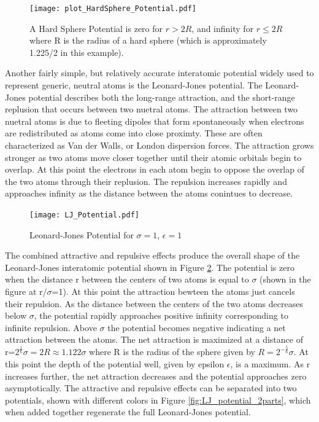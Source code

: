 \documentclass[double,12pt]{beavtex}
\begin{document}
\begin{figure}[h!]
    \centering
    \texttt{[image: plot\_HardSphere\_Potential.pdf]}
    \caption{A Hard Sphere Potential is zero for $r>2R$, and infinity 
    for $r\leq{2R}$ where R is the radius of a hard sphere (which is 
    approximately 1.225/2 in this example).}
    \label{fig:HardSphere_potential}
  \end{figure}

Another fairly simple, but relatively accurate interatomic potential widely 
used to represent generic, neutral atoms is the Leonard-Jones potential. 
The Leonard-Jones potential describes both the long-range attraction, 
and the short-range replusion that occurs between two nuetral atoms. 
The attraction between two nuetral atoms is due to fleeting dipoles that 
form spontaneously when electrons are redistributed as atoms come into 
close proximty. These are often characterized as Van der Walls, or London 
dispersion forces. The attraction grows stronger as two atoms move closer 
together until their atomic orbitals begin to overlap. 
At this point the electrons in each atom begin to oppose the overlap of 
the two atoms through their replusion. The repulsion increases rapidly and 
approaches infinity as the distance between the atoms conintues to decrease.  
 
\begin{figure}[h!]
    \centering
    \texttt{[image: LJ\_Potential.pdf]}
    \caption{Leonard-Jones Potential for $\sigma=1$, $\epsilon=1$}
    \label{fig:LJ_potential}
  \end{figure}

The combined attractive and repulsive effects produce the overall shape of 
the Leonard-Jones interatomic potential shown in Figure \ref{fig:LJ_potential}. 
The potential is zero when the distance r between the centers of two atoms 
is equal to $\sigma$ (shown in the figure at r/$\sigma$=1). At this point 
the attraction bewteen the atoms just cancels their repulsion. As the distance 
between the centers of the two atoms decreases below $\sigma$, the potential 
rapidly approaches positive infinity corresponding to infinite repulsion. 
Above $\sigma$ the potential becomes negative indicating a net attraction 
between the atoms. The net attraction is maximized at a distance of 
r=$2^\frac{1}{6}\sigma=2R\approx{1.122}\sigma$ where R is the radius of 
the sphere given by $R={2^{-\frac{5}{6}}}\sigma$. At this point the depth of
the potential well, given by epsilon $\epsilon$, is a maximum. As r increases 
further, the net attraction decreases and the potential approaches zero
asymptotically. The attractive and repulsive effects can be separated into two
potentials, shown with different colors in Figure \ref{fig:LJ_potential_2parts}, 
which when added together regenerate the full Leonard-Jones potential. 
\end{document}
